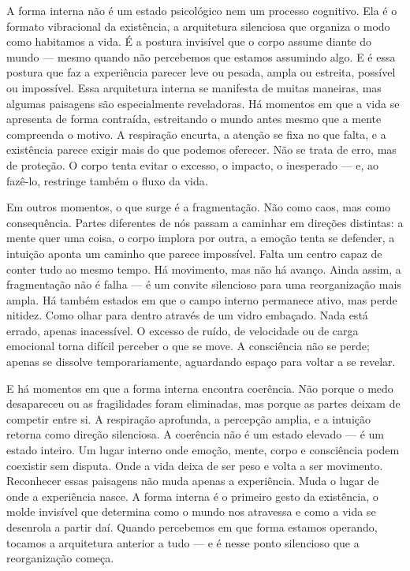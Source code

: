 \documentclass[12pt]{book}
\begin{document}
A forma interna não é um estado psicológico nem um processo cognitivo. Ela é o formato vibracional da existência, a arquitetura silenciosa que organiza o modo como habitamos a vida. É a postura invisível que o corpo assume diante do mundo --- mesmo quando não percebemos que estamos assumindo algo. E é essa postura que faz a experiência parecer leve ou pesada, ampla ou estreita, possível ou impossível. Essa arquitetura interna se manifesta de muitas maneiras, mas algumas paisagens são especialmente reveladoras. Há momentos em que a vida se apresenta de forma contraída, estreitando o mundo antes mesmo que a mente compreenda o motivo. A respiração encurta, a atenção se fixa no que falta, e a existência parece exigir mais do que podemos oferecer. Não se trata de erro, mas de proteção. O corpo tenta evitar o excesso, o impacto, o inesperado --- e, ao fazê-lo, restringe também o fluxo da vida.

Em outros momentos, o que surge é a fragmentação. Não como caos, mas como consequência. Partes diferentes de nós passam a caminhar em direções distintas: a mente quer uma coisa, o corpo implora por outra, a emoção tenta se defender, a intuição aponta um caminho que parece impossível. Falta um centro capaz de conter tudo ao mesmo tempo. Há movimento, mas não há avanço. Ainda assim, a fragmentação não é falha --- é um convite silencioso para uma reorganização mais ampla. Há também estados em que o campo interno permanece ativo, mas perde nitidez. Como olhar para dentro através de um vidro embaçado. Nada está errado, apenas inacessível. O excesso de ruído, de velocidade ou de carga emocional torna difícil perceber o que se move. A consciência não se perde; apenas se dissolve temporariamente, aguardando espaço para voltar a se revelar.

E há momentos em que a forma interna encontra coerência. Não porque o medo desapareceu ou as fragilidades foram eliminadas, mas porque as partes deixam de competir entre si. A respiração aprofunda, a percepção amplia, e a intuição retorna como direção silenciosa. A coerência não é um estado elevado --- é um estado inteiro. Um lugar interno onde emoção, mente, corpo e consciência podem coexistir sem disputa. Onde a vida deixa de ser peso e volta a ser movimento. Reconhecer essas paisagens não muda apenas a experiência. Muda o lugar de onde a experiência nasce. A forma interna é o primeiro gesto da existência, o molde invisível que determina como o mundo nos atravessa e como a vida se desenrola a partir daí. Quando percebemos em que forma estamos operando, tocamos a arquitetura anterior a tudo --- e é nesse ponto silencioso que a reorganização começa.
\end{document}

